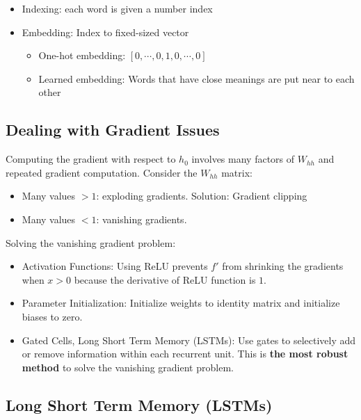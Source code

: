 \documentclass[12pt, a4paper, oneside]{article}
\begin{document}
\begin{itemize}
    \item Indexing: each word is given a number index
    \item Embedding: Index to fixed-sized vector
    \begin{itemize}
        \item One-hot embedding: $[0,\cdots,0,1,0,\cdots,0]$
        \item Learned embedding: Words that have close meanings are put near to each other
    \end{itemize}
\end{itemize}

\subsection{Dealing with Gradient Issues}

Computing the gradient with respect to $h_{0}$ involves many factors of $W_{hh}$ and repeated gradient computation. Consider the $W_{hh}$ matrix:

\begin{itemize}
    \item Many values $>1$: exploding gradients. Solution: Gradient clipping
    \item Many values $<1$: vanishing gradients.
\end{itemize}

Solving the vanishing gradient problem:

\begin{itemize}
    \item Activation Functions: Using ReLU prevents $f'$ from shrinking the gradients when $x>0$ because the derivative of ReLU function is $1$.
    \item Parameter Initialization: Initialize weights to identity matrix and initialize biases to zero.
    \item Gated Cells, Long Short Term Memory (LSTMs): Use gates to selectively add or remove information within each recurrent unit. This is \textbf{the most robust method} to solve the vanishing gradient problem.
\end{itemize}

\subsection{Long Short Term Memory (LSTMs)}
\end{document}
